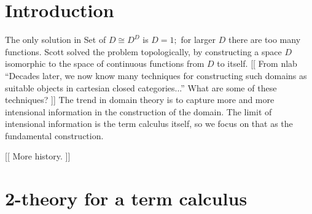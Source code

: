\documentclass[]{acm_proc_article-sp}
\numberwithin{equation}{subsection}
\newcommand{\paperversion}{Draft Version 0.1 - Jan 7, 2015}
\newenvironment{toc}
{
\begin{list}{}{
   \setlength{\leftmargin}{0.4in}
   \setlength{\rightmargin}{0.6in}
   \setlength{\parskip}{0pt}
 } \item }
{\end{list}}
\begin{document}



\section{Introduction}

The only solution in Set of $D \cong D^D$ is $D=1;$ for larger $D$ there are too many functions.  Scott solved the problem topologically, by constructing a space $D$ isomorphic to the space of continuous functions from $D$ to itself. [[ From nlab ``Decades later, we now know many techniques for constructing such domains as suitable objects in cartesian closed categories...''  What are some of these techniques? ]]  The trend in domain theory is to capture more and more intensional information in the construction of the domain.  The limit of intensional information is the term calculus itself, so we focus on that as the fundamental construction.

[[ More history. ]]

\section{2-theory for a term calculus}

\begin{comment}
  * 2-categories with finite products as presentations of configurations

      * problem with 2-morphisms as rewrites

          * normal order evaluation

          * pi calculus

      * reduction contexts as morphisms

          * linear use of reduction contexts in rewrites = number of processors

          * if reduction contexts are consumed, get a notion similar to Ethereum's gas

      * models in Cat

          * monad T

          * free model in Cat on empty category gives a quiver of terms & rewrites
\end{comment}
\end{document}
